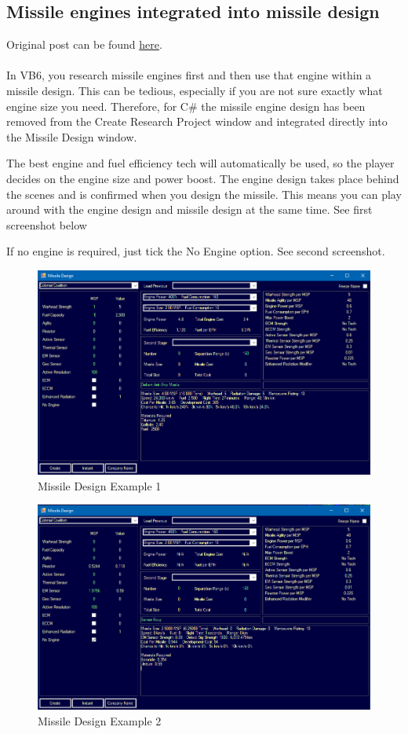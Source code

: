 \documentclass[../../Aurora C# unofficial manual.tex]{subfiles}
\begin{document}
	\subsection{Missile engines integrated into missile design}
	Original post can be found
	\href{http://aurora2.pentarch.org/index.php?topic=8495.msg114126#msg114126}{here}.
	\\\\
	
	In VB6, you research missile engines first and then use that engine within a missile design. This can be tedious, especially if you are not sure exactly what engine size you need. Therefore, for C\# the missile engine design has been removed from the Create Research Project window and integrated directly into the Missile Design window.
	
	The best engine and fuel efficiency tech will automatically be used, so the player decides on the engine size and power boost. The engine design takes place behind the scenes and is confirmed when you design the missile. This means you can play around with the engine design and missile design at the same time. See first screenshot below
	
	If no engine is required, just tick the No Engine option. See second screenshot.
	\begin{figure}[H]
		\centering
		\includegraphics[width=0.7\linewidth]{images/MissileDesign}
		\caption[Missile Design]{Missile Design Example 1}
		\label{fig:missiledesign}
	\end{figure}
	\begin{figure}[H]
		\centering
		\includegraphics[width=0.7\linewidth]{images/MissileDesign2}
		\caption[Missile Design]{Missile Design Example 2}
		\label{fig:missiledesign2}
	\end{figure}
\end{document}

